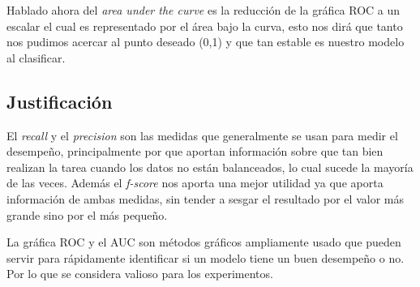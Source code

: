 \par Hablado ahora del \textit{area under the curve} es la reducción de la gráfica ROC a un escalar el cual es representado por el área bajo la curva, esto nos dirá que tanto nos pudimos acercar al punto deseado (0,1) y que tan estable es nuestro modelo al clasificar.

\subsection{Justificación}

\par El \textit{recall} y el \textit{precision} son las medidas que generalmente se usan para medir el desempeño, principalmente por que aportan información sobre que tan bien realizan la tarea cuando los datos no están balanceados, lo cual sucede la mayoría de las veces. Además el \textit{f-score} nos aporta una mejor utilidad ya que aporta información de ambas medidas, sin tender a sesgar el resultado por el valor más grande sino por el más pequeño.

\par La gráfica ROC y el AUC son métodos gráficos ampliamente usado que pueden servir para rápidamente identificar si un modelo tiene un buen desempeño o no. Por lo que se considera valioso para los experimentos.

